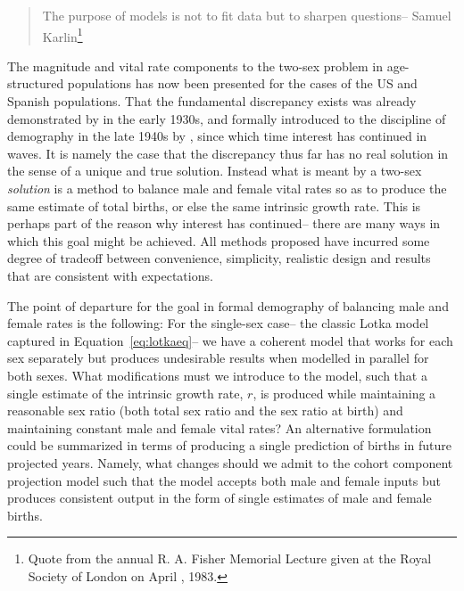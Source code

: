  \FloatBarrier

\begin{singlespace}
\begin{quote}
The purpose of models is not to fit data but to sharpen questions-- Samuel
Karlin\footnote{Quote from the  annual R. A. Fisher Memorial Lecture
given at the Royal Society of London on April , 1983.}
\end{quote}
\end{singlespace}

The magnitude and vital rate components to the two-sex problem in age-structured
populations has now been presented for the cases of the US and Spanish
populations. That the fundamental discrepancy exists was already demonstrated by
\citet{kuczynski1932fertility} in the early 1930s, and formally introduced to
the discipline of demography in the late 1940s by \citet{karmel1947relations},
since which time interest has continued in waves. It is namely the case that the
discrepancy thus far has no real solution in the sense of a unique and true
solution. Instead what is meant by a two-sex \textit{solution} is a method to
balance male and female vital rates so as to produce the same estimate of
total births, or else the same intrinsic growth rate. This is perhaps part of
the reason why interest has continued-- there are many ways in which this goal
might be achieved. All methods proposed have incurred some degree of tradeoff
between convenience, simplicity, realistic design and results that are
consistent with expectations.
 
The point of departure for the goal in formal demography of balancing male and
female rates is the following: For the single-sex case-- the classic Lotka
model captured in Equation~\eqref{eq:lotkaeq}-- we have a coherent model that
works for each sex separately but produces undesirable results when modelled in parallel for both
sexes. What modifications must we introduce to the model, such that a single
estimate of the intrinsic growth rate, $r$, is produced while maintaining a
reasonable sex ratio (both total sex ratio and the sex ratio at birth) and
maintaining constant male and female vital rates? An alternative formulation
could be summarized in terms of producing a single prediction of births in
future projected years. Namely, what changes should we admit to the cohort
component projection model such that the model accepts both male and
female inputs but produces consistent output in the form of single estimates of
male and female births.


 
 
 
 
 
\FloatBarrier